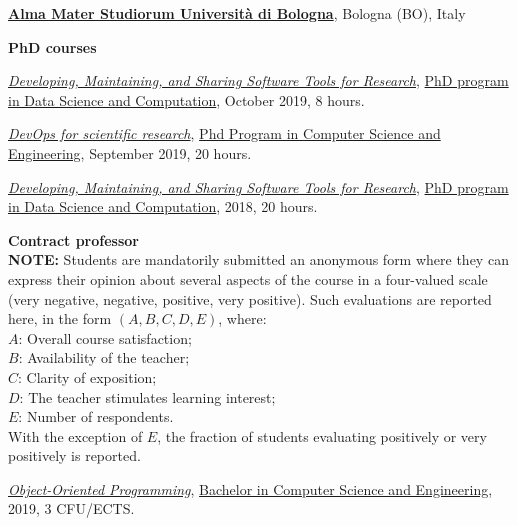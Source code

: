 \href{http://www.unibo.it}{\textbf{Alma Mater Studiorum Università di Bologna}}, Bologna (BO), Italy
\begin{outerlist}
\item[] \textbf{PhD courses} %
    \begin{innerlist}
      \item \href{https://bitbucket.org/danysk/courses-2018-developing-maintaining-and-sharing-software-tools/downloads/}{\textit{Developing, Maintaining, and Sharing Software Tools for Research}}, \href{http://archive.fo/Fmxxm}{PhD program in Data Science and Computation}, October 2019, 8 hours.
      \item \href{http://archive.fo/HKAC6/}{\textit{DevOps for scientific research}}, \href{http://archive.fo/ppTiB}{Phd Program in Computer Science and Engineering}, September 2019, 20 hours.
      \item \href{https://bitbucket.org/danysk/courses-2018-developing-maintaining-and-sharing-software-tools/downloads/}{\textit{Developing, Maintaining, and Sharing Software Tools for Research}}, \href{http://archive.fo/Fmxxm}{PhD program in Data Science and Computation}, 2018, 20 hours.
    \end{innerlist}
\item[] \textbf{Contract professor} %
    \scriptsize{\\ \textbf{NOTE:} Students are mandatorily submitted an anonymous form where they can express their opinion about several aspects of the course in a four-valued scale (very negative, negative, positive, very positive). Such evaluations are reported here, in the form $(A, B, C, D, E)$, where:
    \\$A$: Overall course satisfaction;
    \\$B$: Availability of the teacher;
    \\$C$: Clarity of exposition;
    \\$D$: The teacher stimulates learning interest;
    \\$E$: Number of respondents.
    \\With the exception of $E$, the fraction of students evaluating positively or very positively is reported.
    }
    \normalsize
    \begin{innerlist}
      \item \href{http://archive.fo/JtEDW}{\textit{Object-Oriented Programming}}, \href{http://archive.fo/UM5wl}{Bachelor in Computer Science and Engineering}, 2019, 3 CFU/ECTS.

\end{innerlist}
\end{outerlist}
